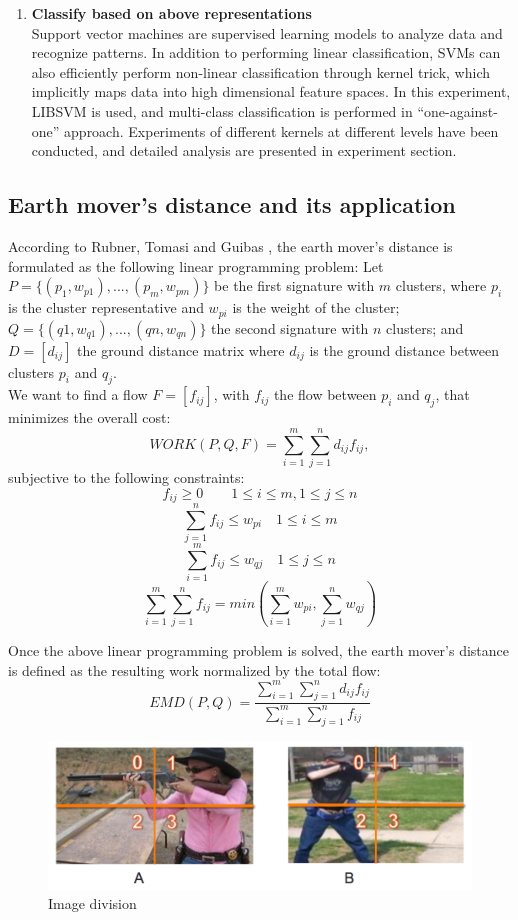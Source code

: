 \begin{enumerate}
	\item {\bfseries Classify based on above representations} 
  \\Support vector machines are supervised learning models to analyze data and recognize patterns. In addition to performing linear classification, SVMs can also efficiently perform non-linear classification through kernel trick, which implicitly maps data into high dimensional feature spaces. In this experiment, LIBSVM \cite{CC01a} is used, and multi-class classification is performed in ``one-against-one'' approach. Experiments of different kernels at different levels have been conducted, and detailed analysis are presented in experiment section.
\end{enumerate}

\subsection{Earth mover's distance and its application}
According to Rubner, Tomasi and Guibas \cite{rubner2000earth}, the earth mover's distance is formulated as the following linear programming problem: Let $P = \{(p_1, w_{p1} ), . . . , (p_m , w_{pm} )\}$ be the first signature with $m$ clusters, where $p_i$ is the cluster representative and $w_{pi}$ is the weight of the cluster; $Q=\{(q1,w_{q1}),...,(qn,w_{qn})\}$ the second signature with $n$ clusters; and $D = [d_{ij}]$ the ground distance matrix where $d_{ij}$ is the ground distance between clusters $p_i$ and $q_j$. \\

\noindent We want to find a flow $F = [f_{ij}]$, with $f_{ij}$ the flow between $p_i$ and $q_j$, that minimizes the overall cost: $$WORK(P , Q, F) = \sum_{i=1}^{m}\sum_{j=1}^{n}d_{ij}f_{ij},$$ subjective to the following constraints: 
$$f_{ij} \geq 0 \quad \quad 1 \leq i \leq m,  1 \leq j \leq n $$ 
$$\sum_{j=1}^n f_{ij} \leq w_{pi} \quad 1 \leq i \leq m$$
$$\sum_{i=1}^m f_{ij} \leq w_{qj} \quad 1 \leq j \leq n$$
$$\sum_{i=1}^{m} \sum_{j=1}^n f_{ij} = min(\sum_{i=1}^m w_{pi}, \sum_{j=1}^n w_{qj})$$

\noindent Once the above linear programming problem is solved, the earth mover's distance is defined as the resulting work normalized by the total flow:
$$EMD(P, Q) = \frac{\sum_{i=1}^m \sum_{j=1}^n d_{ij} f_{ij}}{\sum_{i=1}^m\sum_{j=1}^n f_{ij}}$$

\begin{figure}[!ht]
\centering
	\includegraphics[width=1\textwidth]{./image_EMD_Sample.png}
\caption{Image division}
\end{figure}

